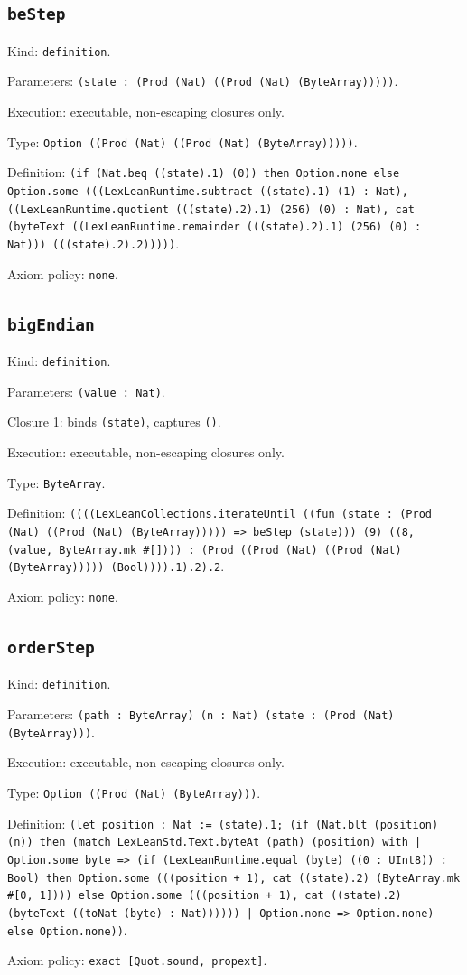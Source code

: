 \documentclass[11pt]{article}
\begin{document}
\subsection*{\texttt{beStep}}
\noindent Kind: \texttt{definition}.\par
\noindent Parameters: \texttt{(state : (Prod (Nat) ((Prod (Nat) (ByteArray)))))}.\par
\noindent Execution: executable, non-escaping closures only.\par
\noindent Type: \texttt{Option ((Prod (Nat) ((Prod (Nat) (ByteArray)))))}.\par
\noindent Definition: \texttt{(if (Nat.beq ((state).1) (0)) then Option.none else Option.some (((LexLeanRuntime.subtract ((state).1) (1) : Nat), ((LexLeanRuntime.quotient (((state).2).1) (256) (0) : Nat), cat (byteText ((LexLeanRuntime.remainder (((state).2).1) (256) (0) : Nat))) (((state).2).2)))))}.\par
\noindent Axiom policy: \texttt{none}.\par
\subsection*{\texttt{bigEndian}}
\noindent Kind: \texttt{definition}.\par
\noindent Parameters: \texttt{(value : Nat)}.\par
\noindent Closure 1: binds \texttt{(state)}, captures \texttt{()}.\par
\noindent Execution: executable, non-escaping closures only.\par
\noindent Type: \texttt{ByteArray}.\par
\noindent Definition: \texttt{((((LexLeanCollections.iterateUntil ((fun (state : (Prod (Nat) ((Prod (Nat) (ByteArray))))) => beStep (state))) (9) ((8, (value, ByteArray.mk \#[]))) : (Prod ((Prod (Nat) ((Prod (Nat) (ByteArray))))) (Bool)))).1).2).2}.\par
\noindent Axiom policy: \texttt{none}.\par
\subsection*{\texttt{orderStep}}
\noindent Kind: \texttt{definition}.\par
\noindent Parameters: \texttt{(path : ByteArray) (n : Nat) (state : (Prod (Nat) (ByteArray)))}.\par
\noindent Execution: executable, non-escaping closures only.\par
\noindent Type: \texttt{Option ((Prod (Nat) (ByteArray)))}.\par
\noindent Definition: \texttt{(let position : Nat := (state).1; (if (Nat.blt (position) (n)) then (match LexLeanStd.Text.byteAt (path) (position) with | Option.some byte => (if (LexLeanRuntime.equal (byte) ((0 : UInt8)) : Bool) then Option.some (((position + 1), cat ((state).2) (ByteArray.mk \#[0, 1]))) else Option.some (((position + 1), cat ((state).2) (byteText ((toNat (byte) : Nat)))))) | Option.none => Option.none) else Option.none))}.\par
\noindent Axiom policy: \texttt{exact [Quot.sound, propext]}.\par
\end{document}
